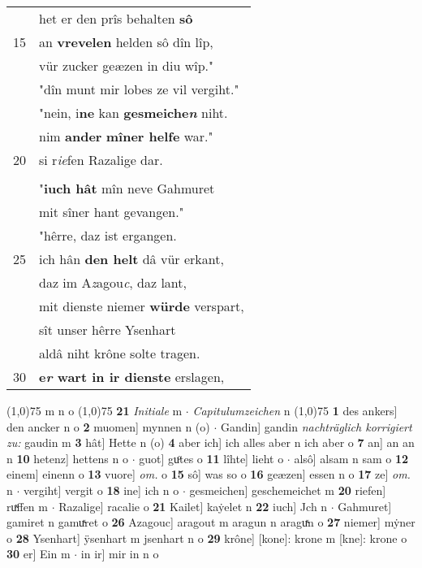 \documentclass[8pt,a4paper,notitlepage]{article}
\begin{document}
\begin{table}[ht]
\begin{minipage}[t]{0.5\linewidth}
\begin{tabular}{rl}
 & het er den prîs behalten \textbf{sô}\\ 
15 & an \textbf{vrevelen} helden sô dîn lîp,\\ 
 & vür zucker geæzen in diu wîp."\\ 
 & "dîn munt mir lobes ze vil vergiht."\\ 
 & "nein, i\textbf{ne} kan \textbf{gesmeiche\textit{n}} niht.\\ 
 & nim \textbf{ander} \textbf{mîner helfe} war."\\ 
20 & si r\textit{ie}fen Razalige dar.\\ 
 & \textbf{\begin{large}M\end{large}it zühten sprach dô} Kailet:\\ 
 & "\textbf{iuch hât} mîn neve Gahmuret\\ 
 & mit sîner hant gevangen."\\ 
 & "hêrre, daz ist ergangen.\\ 
25 & ich hân \textbf{den helt} dâ vür erkant,\\ 
 & daz im A\textit{z}agou\textit{c}, daz lant,\\ 
 & mit dienste niemer \textbf{würde} verspart,\\ 
 & sît unser hêrre Ysenhart\\ 
 & aldâ niht krône solte tragen.\\ 
30 & \textbf{e\textit{r} wart in ir dienste} erslagen,\\ 
\end{tabular}
\scriptsize
\line(1,0){75} \newline
m n o \newline
\line(1,0){75} \newline
\textbf{21} \textit{Initiale} m   $\cdot$ \textit{Capitulumzeichen} n  \newline
\line(1,0){75} \newline
\textbf{1} des ankers] den ancker n o \textbf{2} muomen] mynnen n (o)  $\cdot$ Gandin] gandin \textit{nachträglich korrigiert zu:} gaudin m \textbf{3} hât] Hette n (o) \textbf{4} aber ich] ich alles aber n ich aber o \textbf{7} an] an an n \textbf{10} hetenz] hettens n o  $\cdot$ guot] guͦtes o \textbf{11} lîhte] lieht o  $\cdot$ alsô] alsam n sam o \textbf{12} einem] einenn o \textbf{13} vuore] \textit{om.} o \textbf{15} sô] was so o \textbf{16} geæzen] essen n o \textbf{17} ze] \textit{om.} n  $\cdot$ vergiht] vergit o \textbf{18} ine] ich n o  $\cdot$ gesmeichen] geschemeichet m \textbf{20} riefen] ruͯffen m  $\cdot$ Razalige] racalie o \textbf{21} Kailet] kaẏelet n \textbf{22} iuch] Jch n  $\cdot$ Gahmuret] gamiret n gamuͯret o \textbf{26} Azagouc] aragout m aragun n araguͯn o \textbf{27} niemer] mẏner o \textbf{28} Ysenhart] ÿsenhart m jsenhart n o \textbf{29} krône] [kone]: krone m [kne]: krone o \textbf{30} er] Ein m  $\cdot$ in ir] mir in n o \newline
\end{minipage}
\end{table}
\end{document}
